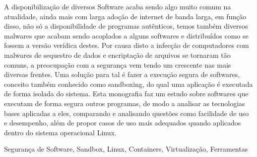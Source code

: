 A disponibilização de diversos Software acaba sendo algo muito comum na atualidade, ainda mais com larga adoção de internet de banda larga, em função disso, não só a disponibilidade de programas autênticos, temos também diversos malwares que acabam sendo acoplados a alguns softwares e distribuídos como se fossem a versão verídica destes. Por causa disto a infecção de computadores com malwares de sequestro de dados e encriptação de arquivos se tornaram tão comuns, a preocupação com a segurança vem tendo um crescente nas mais diversas frentes. Uma solução para tal é fazer a execução segura de softwares, conceito também conhecido como sandboxing, do qual uma aplicação é executada de forma isolada do sistema. Esta monografia faz um estudo sobre softwares que executam de forma segura outros programas, de modo a analisar as tecnologias bases aplicadas a eles, comparando e analisando questões como facilidade de uso e desempenho, além de propor casos de uso mais adequados quando aplicados dentro do sistema operacional Linux.

\begin{keywords}
Segurança de Software, Sandbox, Linux, Containers, Virtualização, Ferramentas
\end{keywords}